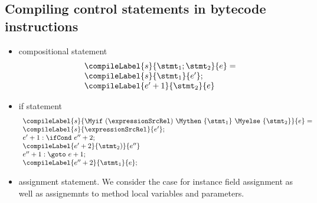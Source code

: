 \subsection{Compiling control statements in bytecode instructions} \label{pogEq:compile:compCtrlStmt}
\begin{itemize}
  \item compositional statement 
      $$\begin{array}{l} \compileLabel{s}{\stmt_1; \stmt_2}{e} = \\  
      
            \compileLabel{s}{\stmt_1}{e'};\\
	    
	    \compileLabel{e'+1}{\stmt_2}{e}
       \end{array}$$
    
  \item   if statement
    $$\begin{array}{l} \compileLabel{s}{ \Myif \ ( \expressionSrcRel ) \ \Mythen \ \{ \stmt_1 \} \  \Myelse \ \{ \stmt_2 \}   }{e} =  \\
        
	    \compileLabel{s}{\expressionSrcRel}{e'}; \\
            e' + 1: \ifCond \ e'' + 2;\\
            \compileLabel{e' + 2}{\stmt_2)}{e''}\\
             e'' + 1: \goto \ e +  1; \\
            \compileLabel{e'' +  2}{\stmt_1}{ e  }; \\
	\end{array}
    $$


\item assignment statement. We consider the case for  instance field assignment as well as  assignemnts to method local variables and parameters. 

\end{itemize}
